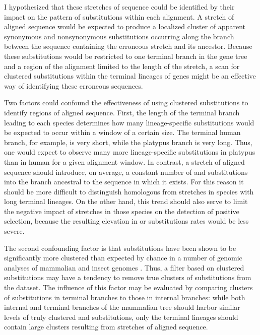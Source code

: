 I hypothesized that these stretches of \nhom sequence could be
identified by their impact on the pattern of substitutions within each
alignment. A stretch of \nhom aligned sequence would be expected to
produce a localized cluster of apparent synonymous and nonsynonymous
substitutions occurring along the branch between the sequence
containing the erroneous stretch and its ancestor. Because these
substitutions would be restricted to one terminal branch in the gene
tree and a region of the alignment limited to the length of the \nhom
stretch, a scan for clustered substitutions within the terminal
lineages of genes might be an effective way of identifying these
erroneous sequences.

Two factors could confound the effectiveness of using clustered
substitutions to identify regions of \nhom aligned sequence. First,
the length of the terminal branch leading to each species determines
how many lineage-specific substitutions would be expected to occur
within a window of a certain size. The terminal human branch, for
example, is very short, while the platypus branch is very long. Thus,
one would expect to observe many more lineage-specific substitutions
in platypus than in human for a given alignment window. In contrast, a
stretch of \nhom aligned sequence should introduce, on average, a
constant number of \nsyn and \syn substitutions into the branch
ancestral to the sequence in which it exists. For this reason it
should be more difficult to distinguish homologous from \nhom
stretches in species with long terminal lineages. On the other hand,
this trend should also serve to limit the negative impact of \nhom
stretches in those species on the detection of positive selection,
because the resulting elevation in \nsyn or \syn substitutions rates
would be less severe.

The second confounding factor is that \nsyn substitutions have been
shown to be significantly more clustered than expected by chance in a
number of genomic analyses of mammalian and insect genomes
\citep{Callahan2011,Bazykin2004,Wang2007}. Thus, a filter based on
clustered \nsyn substitutions may have a tendency to remove true
clusters of \nsyn substitutions from the dataset. The influence of
this factor may be evaluated by comparing clusters of substitutions in
terminal branches to those in internal branches: while both internal
and terminal branches of the mammalian tree should harbor similar
levels of truly clustered \nsyn and \syn substitutions, only the
terminal lineages should contain large clusters resulting from
stretches of aligned \nhom sequence.

